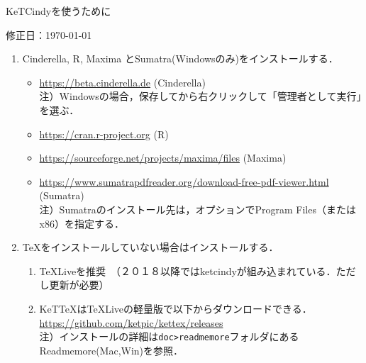 \documentclass{ujarticle}
\begin{document}
\begin{center}
KeTCindyを使うために
\end{center}

\vspace{-5mm}

\hfill 修正日：\today

\begin{enumerate}[\bf\large 1.]
\item Cinderella, R, Maxima とSumatra(Windowsのみ)をインストールする．\vspace{-2mm}

 \begin{itemize}
 \item \url{https://beta.cinderella.de}  (Cinderella)\\
\hspace*{6mm}注）Windowsの場合，保存してから右クリックして「管理者として実行」を選ぶ．
 \item \url{https://cran.r-project.org}   (R)
 \item \url{https://sourceforge.net/projects/maxima/files}  (Maxima)
 \item \url{https://www.sumatrapdfreader.org/download-free-pdf-viewer.html} (Sumatra)\\
\hspace*{6mm}注）Sumatraのインストール先は，オプションでProgram Files（またはx86）を指定する．

 \end{itemize}
\item TeXをインストールしていない場合はインストールする．\vspace{-2mm}
 \begin{enumerate}[(1)]
 \item TeXLiveを推奨　（２０１８以降ではketcindyが組み込まれている．ただし更新が必要）
 \item KeTTeXはTeXLiveの軽量版で以下からダウンロードできる．\\
\hspace*{3mm}\url{https://github.com/ketpic/kettex/releases}\\
    \hspace*{6mm}注）インストールの詳細は\verb|doc>readmemore|フォルダにあるReadmemore(Mac,Win)を参照．

\end{enumerate}
 

\end{enumerate}
\end{document}
